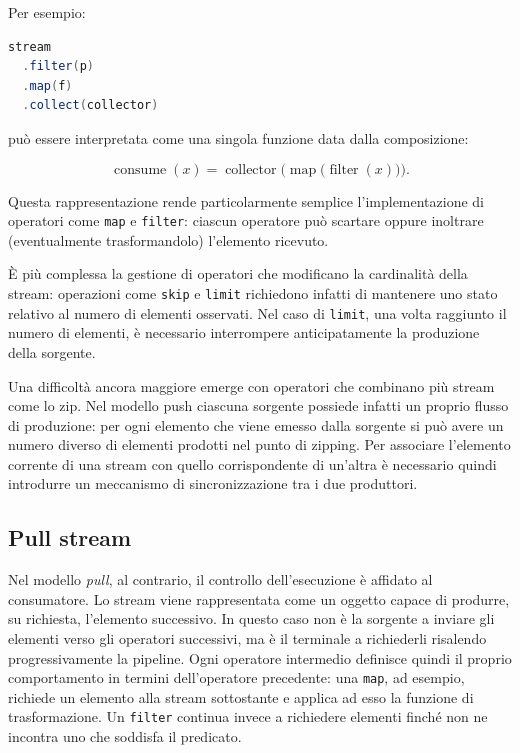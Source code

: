 \documentclass[a4paper,11pt]{report}
\theoremstyle{definition}
\begin{document}
Per esempio:

\begin{lstlisting}[language=Scala]
stream
  .filter(p)
  .map(f)
  .collect(collector)
\end{lstlisting}

può essere interpretata come una singola funzione data dalla composizione:

$$
\operatorname{consume}(x)
=
\operatorname{collector}
\bigl(
  \operatorname{map}
  (
    \operatorname{filter}(x)
  \bigl)
\bigr).
$$

Questa rappresentazione rende particolarmente semplice l'implementazione di operatori come \texttt{map} e \texttt{filter}: ciascun operatore può scartare oppure inoltrare (eventualmente trasformandolo) l'elemento ricevuto.

È più complessa la gestione di operatori che modificano la cardinalità della stream: operazioni come \texttt{skip} e \texttt{limit} richiedono infatti di mantenere uno stato relativo al numero di elementi osservati. Nel caso di \texttt{limit}, una volta raggiunto il numero di elementi, è necessario interrompere anticipatamente la produzione della sorgente.

Una difficoltà ancora maggiore emerge con operatori che combinano più stream come lo zip. Nel modello push ciascuna sorgente possiede infatti un proprio flusso di produzione: per ogni elemento che viene emesso dalla sorgente si può avere un numero diverso di elementi prodotti nel punto di zipping. Per associare l'elemento corrente di una stream con quello corrispondente di un'altra è necessario quindi introdurre un meccanismo di sincronizzazione tra i due produttori.

\subsection{Pull stream}
Nel modello \emph{pull}, al contrario, il controllo dell'esecuzione è affidato al consumatore. Lo stream viene rappresentata come un oggetto capace di produrre, su richiesta, l'elemento successivo.
In questo caso non è la sorgente a inviare gli elementi verso gli operatori successivi, ma è il terminale a richiederli risalendo progressivamente la pipeline. Ogni operatore intermedio definisce quindi il proprio comportamento in termini dell'operatore precedente: una \texttt{map}, ad esempio, richiede un elemento alla stream sottostante e applica ad esso la funzione di trasformazione. Un \texttt{filter} continua invece a richiedere elementi finché non ne incontra uno che soddisfa il predicato.
\end{document}
